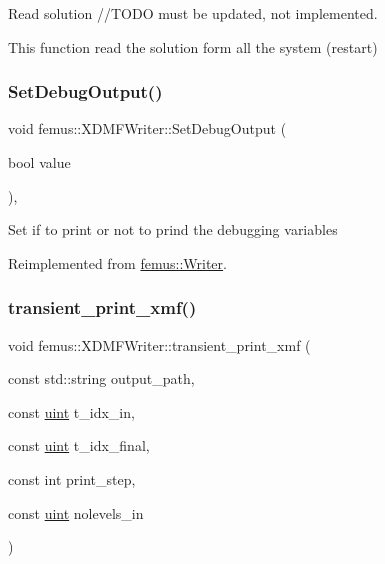 Read solution //\+T\+O\+DO must be updated, not implemented. 

This function read the solution form all the system (restart) \mbox{\label{classfemus_1_1_x_d_m_f_writer_a4c69012d7952e8ac011b876a516d073b}} 
\subsubsection{\texorpdfstring{Set\+Debug\+Output()}{SetDebugOutput()}}
{\footnotesize\ttfamily void femus\+::\+X\+D\+M\+F\+Writer\+::\+Set\+Debug\+Output (\begin{DoxyParamCaption}\item[{bool}]{value }\end{DoxyParamCaption})\hspace{0.3cm}{\ttfamily [inline]}, {\ttfamily [virtual]}}

Set if to print or not to prind the debugging variables 

Reimplemented from \mbox{\hyperlink{classfemus_1_1_writer_a17a6789b58e05989d74698904346f699}{femus\+::\+Writer}}.

\mbox{\label{classfemus_1_1_x_d_m_f_writer_a574cd8744ab63d171e6928636caf6179}} 
\subsubsection{\texorpdfstring{transient\+\_\+print\+\_\+xmf()}{transient\_print\_xmf()}}
{\footnotesize\ttfamily void femus\+::\+X\+D\+M\+F\+Writer\+::transient\+\_\+print\+\_\+xmf (\begin{DoxyParamCaption}\item[{const std\+::string}]{output\+\_\+path,  }\item[{const \mbox{\hyperlink{_typedefs_8hpp_a91ad9478d81a7aaf2593e8d9c3d06a14}{uint}}}]{t\+\_\+idx\+\_\+in,  }\item[{const \mbox{\hyperlink{_typedefs_8hpp_a91ad9478d81a7aaf2593e8d9c3d06a14}{uint}}}]{t\+\_\+idx\+\_\+final,  }\item[{const int}]{print\+\_\+step,  }\item[{const \mbox{\hyperlink{_typedefs_8hpp_a91ad9478d81a7aaf2593e8d9c3d06a14}{uint}}}]{nolevels\+\_\+in }\end{DoxyParamCaption})\hspace{0.3cm}{\ttfamily [static]}}



